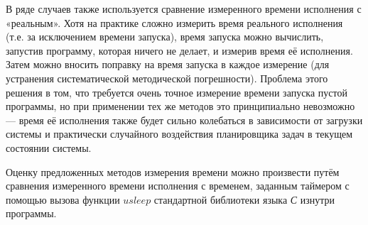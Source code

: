 В ряде случаев также используется сравнение измеренного времени исполнения с «реальным». Хотя на практике сложно измерить время реального исполнения (т.е. за исключением времени запуска), время запуска можно вычислить, запустив программу, которая ничего не делает, и измерив время её исполнения. Затем можно вносить поправку на время запуска в каждое измерение (для устранения систематической методической погрешности). Проблема этого решения в том, что требуется очень точное измерение времени запуска пустой программы, но при применении тех же методов это принципиально невозможно --- время её исполнения также будет сильно колебаться в зависимости от загрузки системы и практически случайного воздействия планировщика задач в текущем состоянии системы.

Оценку предложенных методов измерения времени можно произвести путём сравнения измеренного времени исполнения с временем, заданным таймером с помощью вызова функции $usleep$ стандартной библиотеки языка \textit{С} изнутри программы.
